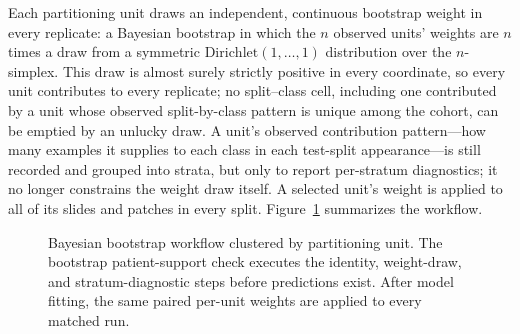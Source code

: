 \documentclass[11pt]{article}
\begin{document}
Each partitioning unit draws an independent, continuous bootstrap weight in every replicate: a Bayesian bootstrap \citep{rubin1981bayesian} in which the $n$ observed units' weights are $n$ times a draw from a symmetric $\mathrm{Dirichlet}(1,\ldots,1)$ distribution over the $n$-simplex. This draw is almost surely strictly positive in every coordinate, so every unit contributes to every replicate; no split--class cell, including one contributed by a unit whose observed split-by-class pattern is unique among the cohort, can be emptied by an unlucky draw. A unit's observed contribution pattern---how many examples it supplies to each class in each test-split appearance---is still recorded and grouped into strata, but only to report per-stratum diagnostics; it no longer constrains the weight draw itself. A selected unit's weight is applied to all of its slides and patches in every split. Figure~\ref{fig:bootstrap-workflow} summarizes the workflow.

\begin{figure}[ht]
  \centering
  \caption{Bayesian bootstrap workflow clustered by partitioning unit. The bootstrap patient-support check executes the identity, weight-draw, and stratum-diagnostic steps before predictions exist. After model fitting, the same paired per-unit weights are applied to every matched run.}
  \label{fig:bootstrap-workflow}
\end{figure}
\end{document}
